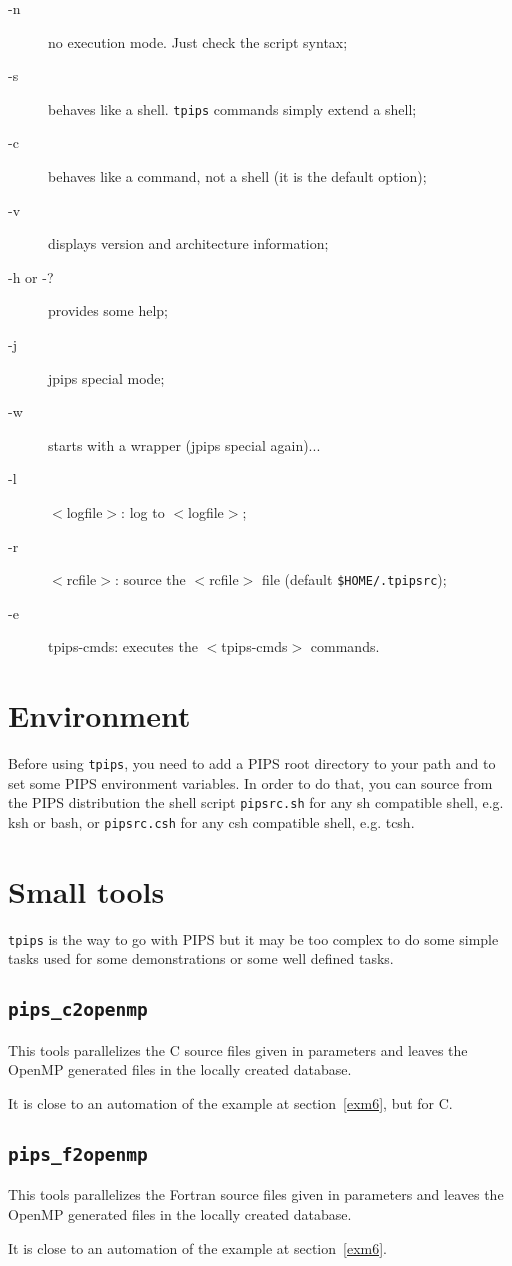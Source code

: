 \documentclass[a4paper,12pt]{article}
\begin{document}
\begin{description}

\item [-n]  no execution mode. Just check the script syntax;
\item [-s] behaves like a shell. {\tt tpips} commands simply extend a shell;
\item [-c] behaves like a command, not a shell (it is the default option);
\item [-v] displays version and architecture information;
\item [-h or -?] provides some help;
\item [-j] jpips special mode;
\item [-w] starts with a wrapper (jpips special again)...
\item [-l] $<$logfile$>$: log to $<$logfile$>$;
\item [-r] $<$rcfile$>$: source the $<$rcfile$>$ file (default
  \verb|$HOME/.tpipsrc|); %
\item [-e] tpips-cmds: executes the $<$tpips-cmds$>$ commands.
\end{description}


\section{Environment}

Before using {\tt tpips}, you need to add a PIPS root directory to your
path and to set some PIPS environment variables. In order to do that, you
can source from the PIPS distribution the shell script \texttt{pipsrc.sh}
for any sh compatible shell, e.g. ksh or bash, or \texttt{pipsrc.csh} for
any csh compatible shell, e.g.  tcsh.


\section{Small tools}
\label{sec:small-tools}

\texttt{tpips} is the way to go with PIPS but it may be too complex to do
some simple tasks used for some demonstrations or some well defined tasks.


\subsection{\texttt{pips\_c2openmp}}
\label{sec:pips_f2openmp}

This tools parallelizes the C source files given in parameters and leaves
the OpenMP generated files in the locally created database.

It is close to an automation of the example at section~\ref{exm6}, but for
C.

\subsection{\texttt{pips\_f2openmp}}
\label{sec:pips_f2openmp}

This tools parallelizes the Fortran source files given in parameters and
leaves the OpenMP generated files in the locally created database.

It is close to an automation of the example at section~\ref{exm6}.
\end{document}
